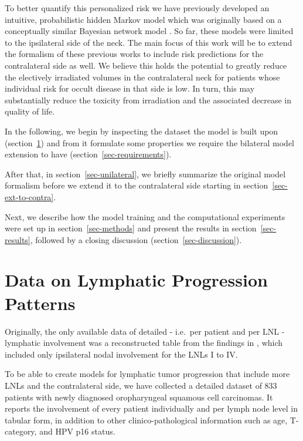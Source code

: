 \documentclass[
  sn-mathphys-num,
]{sn-jnl}
\begin{document}
To better quantify this personalized risk we have previously developed
an intuitive, probabilistic hidden Markov model
\citep{ludwig_hidden_2021, ludwig_modelling_2023} which was originally
based on a conceptually similar Bayesian network model
\citep{pouymayou_bayesian_2019}. So far, these models were limited to
the ipsilateral side of the neck. The main focus of this work will be to
extend the formalism of these previous works to include risk predictions
for the contralateral side as well. We believe this holds the potential
to greatly reduce the electively irradiated volumes in the contralateral
neck for patients whose individual risk for occult disease in that side
is low. In turn, this may substantially reduce the toxicity from
irradiation and the associated decrease in quality of life.

In the following, we begin by inspecting the dataset the model is built
upon (section~\ref{sec-data}) and from it formulate some properties we
require the bilateral model extension to have
(section~\ref{sec-requirements}).

After that, in section~\ref{sec-unilateral}, we briefly summarize the
original model formalism before we extend it to the contralateral side
starting in section~\ref{sec-ext-to-contra}.

Next, we describe how the model training and the computational
experiments were set up in section~\ref{sec-methods} and present the
results in section~\ref{sec-results}, followed by a closing discussion
(section~\ref{sec-discussion}).

\section{Data on Lymphatic Progression Patterns}\label{sec-data}

Originally, the only available data of detailed - i.e.~per patient and
per LNL - lymphatic involvement was a reconstructed table from the
findings in \citet{sanguineti_defining_2009}, which included only
ipsilateral nodal involvement for the LNLs I to IV.

To be able to create models for lymphatic tumor progression that include
more LNLs and the contralateral side, we have collected a detailed
dataset of 833 patients with newly diagnosed oropharyngeal squamous cell
carcinomas. It reports the involvement of every patient individually and
per lymph node level in tabular form, in addition to other
clinico-pathological information such as age, T-category, and HPV p16
status.
\end{document}
